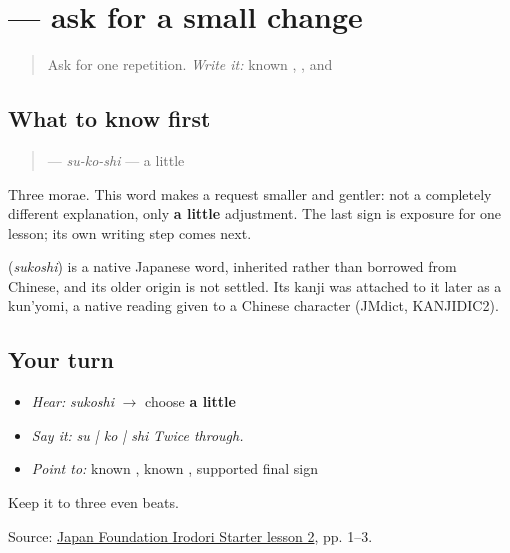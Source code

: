\section[\texorpdfstring{\ja{すこし} (sukoshi)}{すこし (sukoshi)}]{ — ask for a small change}

\label{lesson:JA-C10-sukoshi}



\begin{quote}
Ask for one repetition. \emph{Write it:} known \textbf{}, \textbf{}, and \textbf{}
\end{quote}

\subsection*{What to know first}
\begin{quote}
\textbf{} — \emph{su-ko-shi} — a little
\end{quote}

Three morae. This word makes a request smaller and gentler: not a completely different explanation, only \textbf{a little} adjustment. The last sign is exposure for one lesson; its own writing step comes next.

\begin{cousinweb}
\textbf{} (\emph{sukoshi}) is a native Japanese word, inherited rather than borrowed from Chinese, and its older origin is not settled. Its kanji was attached to it later as a kun'yomi, a native reading given to a Chinese character (JMdict, KANJIDIC2).
\end{cousinweb}

\subsection*{Your turn}
\begin{itemize}
\raggedright
  \item \emph{Hear:} \emph{sukoshi} $\to$ choose \textbf{a little}
  \item \emph{Say it:} \emph{su | ko | shi} \emph{Twice through.}
  \item \emph{Point to:} known \textbf{}, known \textbf{}, supported final sign
\end{itemize}

\begin{tcolorbox}[breakable,colback=teal!4,colframe=teal!35!black,title={Before you move on}]
Keep it to three even beats.

Source: \href{https://www.irodori.jpf.go.jp/assets/data/starter/pdf/X\_L02.pdf}{Japan Foundation Irodori Starter lesson 2}, pp. 1–3.
\end{tcolorbox}
